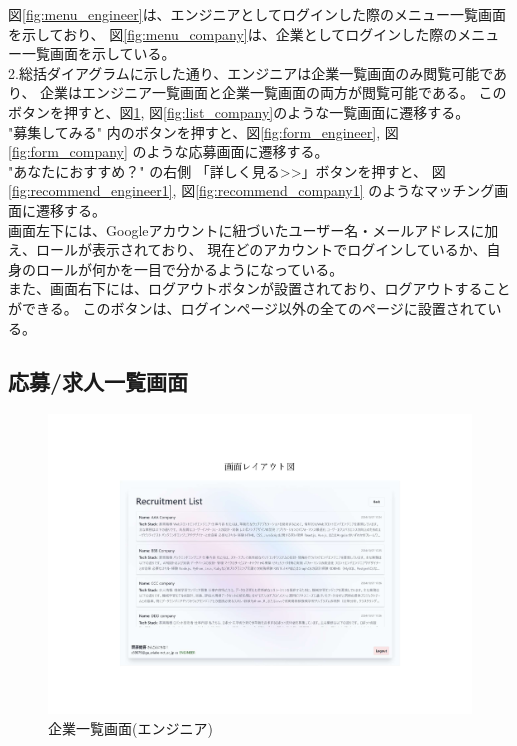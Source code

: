 \documentclass[10pt]{ltjsarticle}
\begin{document}
図\ref{fig:menu_engineer}は、エンジニアとしてログインした際のメニュー一覧画面を示しており、
図\ref{fig:menu_company}は、企業としてログインした際のメニュー一覧画面を示している。\\
\indent 2.総括ダイアグラムに示した通り、エンジニアは企業一覧画面のみ閲覧可能であり、
企業はエンジニア一覧画面と企業一覧画面の両方が閲覧可能である。
このボタンを押すと、図\ref{fig:list_engineer}, 図\ref{fig:list_company}のような一覧画面に遷移する。\\
\indent "募集してみる" 内のボタンを押すと、図\ref{fig:form_engineer}, 図\ref{fig:form_company}
のような応募画面に遷移する。\\
\indent "あなたにおすすめ？" の右側 「詳しく見る>>」ボタンを押すと、
図\ref{fig:recommend_engineer1}, 図\ref{fig:recommend_company1}
のようなマッチング画面に遷移する。\\
\indent 画面左下には、Googleアカウントに紐づいたユーザー名・メールアドレスに加え、ロールが表示されており、
現在どのアカウントでログインしているか、自身のロールが何かを一目で分かるようになっている。\\
\indent また、画面右下には、ログアウトボタンが設置されており、ログアウトすることができる。
このボタンは、ログインページ以外の全てのページに設置されている。
\newpage
\subsection{応募/求人一覧画面}
\begin{figure}[H]
    \centering
    \includegraphics[trim=5.2cm 3.4cm 5.2cm 4.6cm, clip, width=14cm]{./img/List_pages_engineer.pdf}
    \caption{企業一覧画面(エンジニア)}
    \label{fig:list_engineer}
\end{figure}
\vspace{-.5cm}
\end{document}

